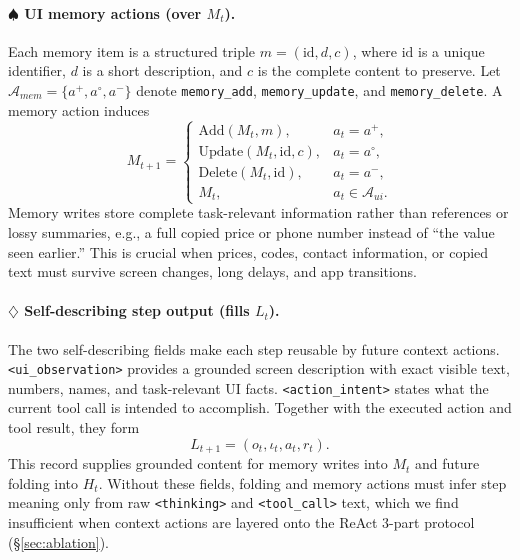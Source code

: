 \documentclass{llmxive}
\providecommand{\memaction}[1]{\texttt{#1}}
\providecommand{\recentfield}[1]{\texttt{#1}}
\providecommand{\symmem}{$\spadesuit$\xspace}
\providecommand{\symstep}{$\diamondsuit$\xspace}
\begin{document}
\paragraph{\symmem UI memory actions (over \texorpdfstring{$M_t$}{Mt}).}
\label{sec:method-mem}
Each memory item is a structured triple $m=(\mathrm{id},d,c)$, where $\mathrm{id}$ is a unique identifier, $d$ is a short description, and $c$ is the complete content to preserve. Let $\mathcal{A}_{mem}=\{a^{+},a^{\circ},a^{-}\}$ denote \memaction{memory\_add}, \memaction{memory\_update}, and \memaction{memory\_delete}. A memory action induces
\begin{equation}
\label{eq:memory-update}
M_{t+1}=
\begin{cases}
\mathrm{Add}(M_t,m),
& a_t=a^{+},\\
\mathrm{Update}(M_t,\mathrm{id},c),
& a_t=a^{\circ},\\
\mathrm{Delete}(M_t,\mathrm{id}),
& a_t=a^{-},\\
M_t,
& a_t\in\mathcal{A}_{ui}.
\end{cases}
\end{equation}
Memory writes store complete task-relevant information rather than references or lossy summaries, e.g., a full copied price or phone number instead of ``the value seen earlier.'' This is crucial when prices, codes, contact information, or copied text must survive screen changes, long delays, and app transitions.

\paragraph{\symstep Self-describing step output (fills \texorpdfstring{$L_t$}{Lt}).}
\label{sec:method-step}
The two self-describing fields make each step reusable by future context actions. \recentfield{<ui\_observation>} provides a grounded screen description with exact visible text, numbers, names, and task-relevant UI facts. \recentfield{<action\_intent>} states what the current tool call is intended to accomplish. Together with the executed action and tool result, they form
\begin{equation}
\label{eq:recent-update}
L_{t+1}
=
(
o_t,
\iota_t,
a_t,
r_t
).
\end{equation}
This record supplies grounded content for memory writes into $M_t$ and future folding into $H_t$. Without these fields, folding and memory actions must infer step meaning only from raw \texttt{<thinking>} and \texttt{<tool\_call>} text, which we find insufficient when context actions are layered onto the ReAct 3-part protocol (\S\ref{sec:ablation}).
\end{document}
